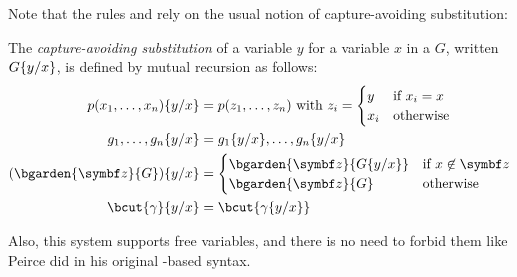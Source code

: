 \begin{scope}
\begin{scope}
Note that the rules  and  rely on the usual notion
of capture-avoiding substitution:

\begin{definition}[Substitution]
  The \emph{capture-avoiding substitution} of a variable $y$ for a variable $x$
  in a  $G$, written $G \{ y / x \}$, is defined by mutual
  recursion as follows:
  \begin{align*}
    \subst{p(x_1,\ldots,x_n)}{y}{x} &= p(z_1, \ldots, z_n) \text{ with } z_i = \begin{cases}
      y &\text{if $x_i = x$} \\
      x_i &\text{otherwise}
    \end{cases} \\
    \subst{g_1, \ldots, g_n}{y}{x} &= \subst{g_1}{y}{x}, \ldots, \subst{g_n}{y}{x} \\
    \subst{(\bgarden{\bz}{G})}{y}{x} &= \begin{cases}
      \bgarden{\bz}{\subst{G}{y}{x}} &\text{if $x \not\in \bz$} \\
      \bgarden{\bz}{G} &\text{otherwise}
    \end{cases} \\
    \subst{\bcut{\gamma}}{y}{x} &= \bcut{\subst{\gamma}{y}{x}}
  \end{align*}
\end{definition}

Also, this system supports free variables, and there is no need to forbid them
like Peirce did in his original -based syntax.


\end{scope}
\end{scope}
